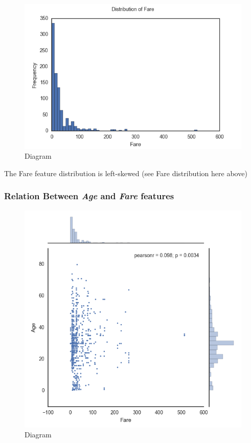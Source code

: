 \documentclass[11pt]{article}
\makeatletter
\def\maxwidth{\ifdim\Gin@nat@width>\linewidth\linewidth
    \else\Gin@nat@width\fi}
\let\Oldincludegraphics\includegraphics
\renewcommand{\includegraphics}[1]{\Oldincludegraphics[width=.8\maxwidth]{#1}}
\makeatother
\begin{document}
    \begin{figure}
\centering
\includegraphics{FareDistribution.png}
\caption{Diagram}
\end{figure}

    The Fare feature distribution is left-skewed (see Fare distribution here
above)

    \subsubsection{\texorpdfstring{Relation Between \emph{Age} and
\emph{Fare}
features}{Relation Between Age and Fare features}}\label{relation-between-age-and-fare-features}

    \begin{figure}
\centering
\includegraphics{RelationFarevsAge.png}
\caption{Diagram}
\end{figure}
\end{document}
